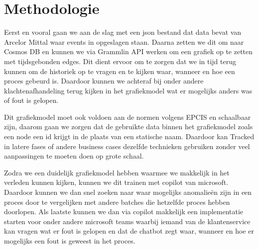 


\section{Methodologie}%
\label{sec:methodologie}
Eerst en vooral gaan we aan de slag met een json bestand dat data bevat van Arcelor Mittal waar events in opgeslagen staan.
Daarna zetten we dit om naar Cosmos DB en kunnen we via Grammlin API werken om een grafiek op te zetten met tijdsgebonden edges. Dit dient ervoor om te zorgen dat we in tijd terug kunnen om de historiek op te vragen en te kijken waar, wanneer en hoe een proces gebeurd is.
Daardoor kunnen we achteraf bij onder andere klachtenafhandeling terug kijken in het grafiekmodel wat er mogelijks anders was of fout is gelopen.

Dit grafiekmodel moet ook voldoen aan de normen volgens EPCIS en schaalbaar zijn, daarom gaan we zorgen dat de gebruikte data binnen het grafiekmodel zoals een node een id krijgt in de plaats van een statische naam.
Daardoor kan Tracked in latere fases of andere business cases dezelfde technieken gebruiken zonder veel aanpassingen te moeten doen op grote schaal.

Zodra we een duidelijk grafiekmodel hebben waarmee we makkelijk in het verleden kunnen kijken, kunnen we dit trainen met copilot van microsoft.
Daardoor kunnen we dan snel zoeken naar waar mogelijks anomalieën zijn in een proces door te vergelijken met andere batches die hetzelfde proces hebben doorlopen.
Als laatste kunnen we dan via copilot makkelijk een implementatie starten voor onder andere microsoft teams waarbij iemand van de klantenservice kan vragen wat er fout is gelopen en dat de chatbot zegt waar, wanneer en hoe er mogelijks een fout is geweest in het proces.

